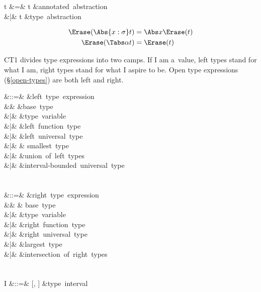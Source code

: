\documentclass{amsart}
\begin{document}

\begin{syntax}
t &\+=& t &\mbox{annotated abstraction}\\
&|& \Tabs\alpha t &\mbox{type abstraction}
\end{syntax}%

\begin{align*}
\Erase(\Abs{x:\sigma}t) & = \Abs x\Erase(t)\\
\Erase(\Tabs\alpha t) &= \Erase(t)
\end{align*}


CT1 divides type expressions into two camps. If I am a~value,
left types stand for what I am, right types stand for what I
aspire to be. Open type expressions (\S\ref{open-types}) are both
left and right.

\begin{syntax}
\rho &::=& &\mbox{left type expression}\\
&& \iota &\mbox{base type}\\
&|& \alpha &\mbox{type variable}\\
&|& \tau \R \rho &\mbox{left function type}\\
&|& \All\alpha\rho &\mbox{left universal type}\\
&|& \Bot & \mbox{smallest type}\\
&|& \rho\cup\rho &\mbox{union of left types}\\
&|& \rho &\mbox{interval-bounded universal type}\\
\\\\
\tau &::=& &\mbox{right type expression}\\
&& \iota & \mbox{base type}\\
&|& \alpha &\mbox{type variable}\\
&|& \rho \R \tau &\mbox{right function type}\\
&|& \All\alpha\tau &\mbox{right universal type}\\
&|& \Top &\mbox{largest type}\\
&|& \tau\cap\tau &\mbox{intersection of right types}\\
\\\\
I &::=& [\rho, \tau] &\mbox{type interval}
\end{syntax}%

\label{interp-ct-types}
\end{document}
